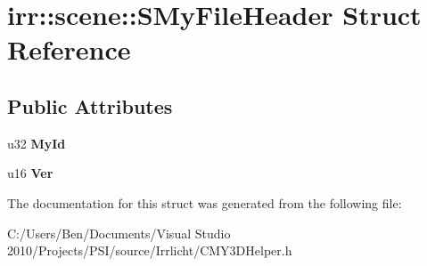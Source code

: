 \hypertarget{structirr_1_1scene_1_1_s_my_file_header}{\section{irr\-:\-:scene\-:\-:S\-My\-File\-Header Struct Reference}
\label{structirr_1_1scene_1_1_s_my_file_header}
}
\subsection*{Public Attributes}
\begin{DoxyCompactItemize}
\item 
\hypertarget{structirr_1_1scene_1_1_s_my_file_header_aefc41a015063f476e09c46118f0df690}{u32 {\bfseries My\-Id}}\label{structirr_1_1scene_1_1_s_my_file_header_aefc41a015063f476e09c46118f0df690}

\item 
\hypertarget{structirr_1_1scene_1_1_s_my_file_header_ac0dc79c72991045d0b41b817bb9a3e6c}{u16 {\bfseries Ver}}\label{structirr_1_1scene_1_1_s_my_file_header_ac0dc79c72991045d0b41b817bb9a3e6c}

\end{DoxyCompactItemize}


The documentation for this struct was generated from the following file\-:\begin{DoxyCompactItemize}
\item 
C\-:/\-Users/\-Ben/\-Documents/\-Visual Studio 2010/\-Projects/\-P\-S\-I/source/\-Irrlicht/C\-M\-Y3\-D\-Helper.\-h\end{DoxyCompactItemize}
